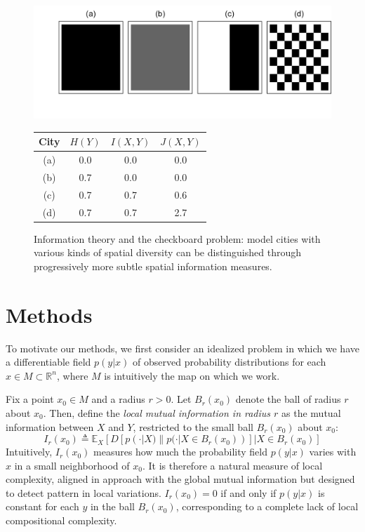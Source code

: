 \documentclass[english]{scrartcl}
\newcommand\E[0]{\mathbb{E}}
\newcommand\R[0]{\mathbb{R}}
\begin{document}
	\begin{figure}
		\centering
		  \includegraphics[width=.7\linewidth]{figs/toy.png}
		  \begin{tabular}{c | c c c}
			  City & $H(Y)$ & $I(X,Y)$ & $J(X,Y)$ \\
			  \hline			
			  (a) & 0.0 & 0.0 & 0.0\\
			  (b) & 0.7 & 0.0 & 0.0\\
			  (c) & 0.7 & 0.7 & 0.6\\
			  (d) & 0.7 & 0.7 & 2.7\\
			  \hline  
			\end{tabular}
		\caption{Information theory and the checkboard problem: model cities with various kinds of spatial diversity can be distinguished through progressively more subtle spatial information measures.}
		\label{fig:toy}
		\end{figure}

\section{Methods}
	To motivate our methods, we first consider an idealized problem in which we have a differentiable field $p(y|x)$ of observed probability distributions for each $x \in M \subset \R^n$, where $M$ is intuitively the map on which we work. 

	Fix a point $x_0 \in M$ and a radius $r > 0$. Let $B_r(x_0)$ denote the ball of radius $r$ about $x_0$. Then, define the \emph{local mutual information in radius $r$} as the mutual information between $X$ and $Y$, restricted to the small ball $B_r(x_0)$ about $x_0$:
	\begin{equation}
		I_r(x_0) \triangleq \E_X[D[p(\cdot|X)\| p(\cdot|X \in B_r(x_0))]|X \in B_r(x_0)]
	\end{equation}
	Intuitively, $I_r(x_0)$ measures how much the probability field $p(y|x)$ varies with $x$ in a small neighborhood of $x_0$. It is therefore a natural measure of local complexity, aligned in approach with the global mutual information but designed to detect pattern in local variations. $I_r(x_0) = 0$ if and only if $p(y|x)$ is constant for each $y$ in the ball $B_r(x_0)$, corresponding to a complete lack of local compositional complexity. 
\end{document}
